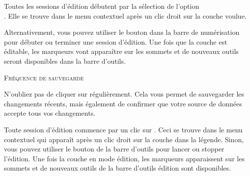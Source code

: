 
Toutes les sessions d'édition débutent par la sélection de l'option\\ . Elle se trouve dans le menu contextuel après un clic droit sur la couche voulue.


Alternativement, vous pouvez utiliser le bouton  dans la barre de numérisation pour débuter ou terminer une session d'édition. Une fois que la couche est éditable, les marqueurs vont apparaître sur les sommets et de nouveaux outils seront disponibles dans la barre d'outils.

\begin{Tip}[ht]\caption{\textsc{Fréquence de sauvegarde}}
N'oubliez pas de cliquer sur  régulièrement. Cela vous permet de sauvegarder les changements récents, mais également de confirmer que votre source de données accepte tous vos changements.
\end{Tip}

Toute session d'édition commence par un clic sur . Ceci se trouve dans le menu contextuel qui apparaît après un clic droit sur la couche dans la légende. Sinon, vous pouvez utiliser le bouton   de la barre d'outils pour lancer ou stopper l'édition.  Une fois la couche en mode édition, les marqueurs apparaissent sur les sommets et de nouveaux outils de la barre d'outils édition sont disponibles.

